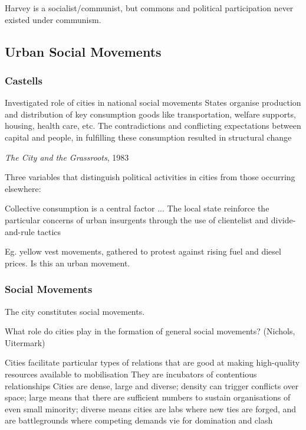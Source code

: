 \documentclass{article}
\begin{document}
Harvey is a socialist/communist, but commons and political participation never existed under communism.

\subsection{Urban Social Movements}

\subsubsection{Castells}

\begin{outline}
	\1 Investigated role of cities in national social movements
	\1 States organise production and distribution of key consumption goods like transportation, welfare supports, housing, health care, etc.
	\1 The contradictions and conflicting expectations between capital and people, in fulfilling these consumption resulted in structural change
\end{outline}

\textit{The City and the Grassroots}, 1983

Three variables that distinguish political activities in cities from those occurring elsewhere:

\begin{outline}
	\1 Collective consumption is a central factor
	\1 ...
	\1 The local state reinforce the particular concerns of urban insurgents through the use of clientelist and divide-and-rule tactics
\end{outline}

Eg. yellow vest movements, gathered to protest against rising fuel and diesel prices. Is this an urban movement. 

\subsubsection{Social Movements}

The city constitutes social movements. 

What role do cities play in the formation of general social movements? (Nichols, Uitermark)

\begin{outline}
	\1 Cities facilitate particular types of relations that are good at making high-quality resources available to mobilisation
	\1 They are incubators of contentious relationships
	\1 Cities are dense, large and diverse; density can trigger conflicts over space; large means that there are sufficient numbers to sustain organisations of even small minority; diverse means cities are labs where new ties are forged, and are battlegrounds where competing demands vie for domination and clash
\end{outline}
\end{document}
